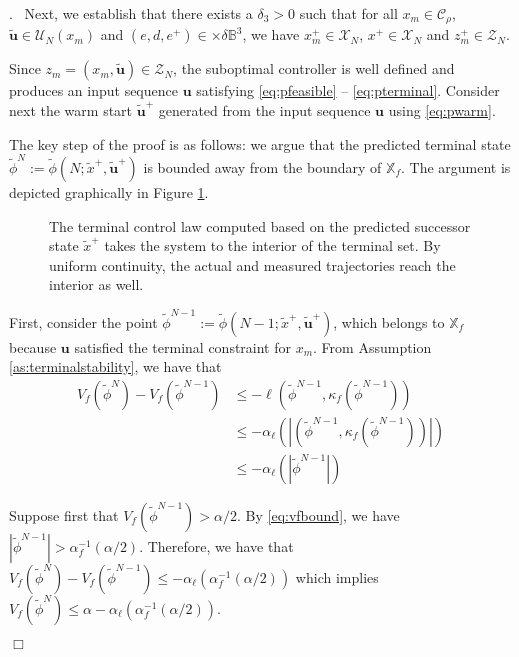 \documentclass{article}
\newenvironment{proof}{\noindent {\em Proof}.\ }{\hspace*{\fill}$\Box$\medskip\\}
\newcommand{\abs}[1]{\left\lvert #1 \right\rvert}
\begin{document}
\begin{proof}
Next, we establish that there exists a $\delta_3 > 0$ such that for all 
$x_m \in \mathcal{C}_\rho$, $\tilde{\mathbf{u}} \in \mathcal{U}_N(x_m)$ and $(e,d,e^+) \in  \times \delta\mathbb{B}^3$, 
we have $x_m^+ \in \mathcal{X}_N$,
$x^+ \in \mathcal{X}_N$ and $z_m^+ \in \mathcal{Z}_N$. 

Since $z_m = (x_m,\tilde{\mathbf{u}}) \in \mathcal{Z}_N$, the suboptimal controller is well defined and produces 
an input sequence $\mathbf{u}$ satisfying \eqref{eq:pfeasible} -- \eqref{eq:pterminal}. 
Consider next the warm start $\tilde{\mathbf{u}}^+$ generated from the input sequence $\mathbf{u}$ using 
\eqref{eq:pwarm}.

The key step of the proof is as follows: we argue that the predicted terminal state $\tilde{\phi}^N :=
\tilde{\phi}(N;\tilde{x}^+,\tilde{\mathbf{u}}^+)$ is bounded away from the boundary of $\mathbb{X}_f$. The argument
is depicted graphically in Figure \ref{fig:feasibility}.
\begin{figure}
\scalebox{.8}{}
\caption{The terminal control law computed based on the predicted successor state $\tilde{x}^+$ takes the system
to the interior of the terminal set. By uniform continuity, the actual and measured trajectories reach the interior as well.}
\label{fig:feasibility}
\end{figure} 
First, consider the point 
$\tilde{\phi}^{N-1} := \tilde{\phi}(N-1;\tilde{x}^+,\tilde{\mathbf{u}}^+)$, which belongs to $\mathbb{X}_f$ 
because $\mathbf{u}$ satisfied the terminal constraint for $x_m$. From Assumption \ref{as:terminalstability}, 
we have that 
\begin{align*}
V_f(\tilde{\phi}^N) - V_f(\tilde{\phi}^{N-1}) &\leq - 
\ell(\tilde{\phi}^{N-1},\kappa_f(\tilde{\phi}^{N-1})) \\
&\leq - \alpha_\ell(\abs{(\tilde{\phi}^{N-1},\kappa_f(\tilde{\phi}^{N-1}))}) \\
&\leq - \alpha_\ell(\abs{\tilde{\phi}^{N-1}})
\end{align*}

Suppose first that $V_f(\tilde{\phi}^{N-1}) > \alpha/2$. By \eqref{eq:vfbound}, we have $\abs{\tilde{\phi}^{N-1}} > 
\alpha_f^{-1}(\alpha/2)$. Therefore, we have that
$V_f(\tilde{\phi}^N) - V_f(\tilde{\phi}^{N-1}) \leq - \alpha_\ell(\alpha_f^{-1}(\alpha/2))$ which implies
$V_f(\tilde{\phi}^N)  \leq \alpha - \alpha_\ell(\alpha_f^{-1}(\alpha/2))$. 


\end{proof}
\end{document}
